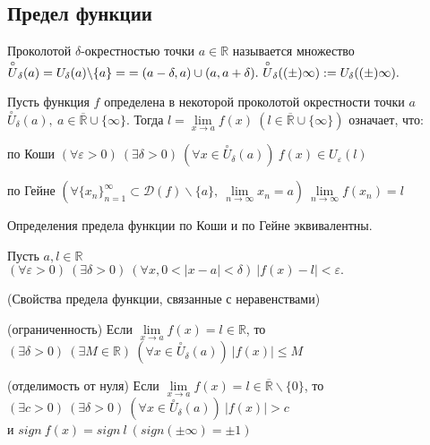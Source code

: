 \begin{multicols}{2}
\subsection*{Предел функции}
\begin{definition}{}{}
    Проколотой $\delta$-окрестностью точки $a \in\mathbb R$ называется множество $\overset{\circ}{U}_\delta (a) = U_\delta(a)\backslash \{a\} = \mathmbox{= (a-\delta, a)\cup (a,a+\delta).} \ \overset{\circ}{U}_\delta((\pm)\infty)  := U_\delta((\pm)\infty).$
\end{definition}
\begin{definition}{}{}
    Пусть функция $f$ определена в некоторой проколотой окрестности точки $a$ $\overset{\circ}{U}_\delta(a),\ a\in\overline{\mathbb R}\cup \{\infty\}.$ Тогда $l = \lim\limits_{x\to a} f(x)\ (l \in \overline{\mathbb R} \cup \{\infty\})$ означает, что:\begin{enumerate*}
        \item[\footnotesize{по Коши}] \mbox{$(\forall \varepsilon > 0)\ (\exists \delta > 0)\ (\forall x \in\overset{\circ}{U}_\delta (a))\ f(x)\in U_\varepsilon(l)$}
        \item[\footnotesize{по Гейне}] \mbox{$(\forall \{x_n\}_{n = 1}^\infty \subset \mathscr D(f) \backslash \{a\},\ \lim\limits_{n\to \infty}x_n = a)\ \lim\limits_{n\to\infty} f(x_n) = l$}
    \end{enumerate*}
\end{definition}
\begin{theorema}{}{}
    Определения предела функции по Коши и по Гейне эквивалентны.
\end{theorema}
Пусть $a, l \in\mathbb R$\\$(\forall \varepsilon > 0)\ (\exists \delta > 0)\ (\forall x, 0 < |x-a| < \delta)\ |f(x) - l| < \varepsilon.$
\begin{theorema}{(Свойства предела функции, связанные с неравенствами)}{}
    \begin{enumerate*}
		\item (ограниченность) Если $\lim\limits_{x\to a} f(x) = l \in\mathbb R$, то\\ $(\exists \delta > 0)\ (\exists M \in\mathbb R)\ (\forall x \in\overset{\circ}{U}_\delta(a))\ |f(x)| \leq M$ 
		\item (отделимость от нуля) Если $\lim\limits_{x\to a} f(x) = l \in\overline{\mathbb R} \backslash \{0\}$, то \\$(\exists c > 0)\ (\exists \delta > 0)\ (\forall x \in\overset{\circ}{U}_\delta(a))\ |f(x)| > c$\\ и $sign\ f(x) = sign\ l\ (sign(\pm \infty) = \pm 1)$

\end{enumerate*}
\end{theorema}
\end{multicols}

